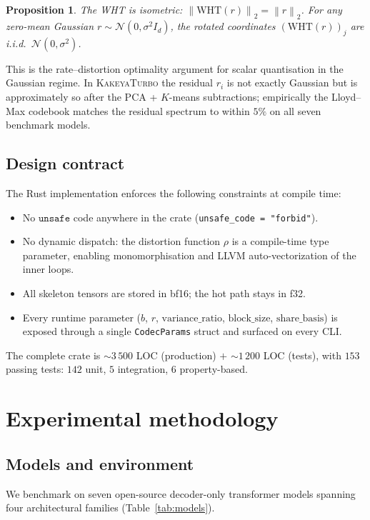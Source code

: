 \documentclass[11pt,a4paper]{article}
\theoremstyle{definition}
\theoremstyle{plain}
\newtheorem{proposition}[theorem]{Proposition}
\newcommand{\norm}[1]{\left\lVert#1\right\rVert}
\begin{document}
\begin{proposition}
The WHT is isometric: $\norm{\mathrm{WHT}(r)}_2 = \norm{r}_2$. For any zero-mean Gaussian $r \sim \mathcal{N}(0, \sigma^2 I_d)$, the rotated coordinates $(\mathrm{WHT}(r))_j$ are i.i.d.\ $\mathcal{N}(0, \sigma^2)$.
\end{proposition}

This is the rate--distortion optimality argument for scalar quantisation in the Gaussian regime. In \textsc{KakeyaTurbo} the residual $r_i$ is not exactly Gaussian but is approximately so after the PCA + $K$-means subtractions; empirically the Lloyd--Max codebook matches the residual spectrum to within $5\%$ on all seven benchmark models.

\subsection{Design contract}

The Rust implementation enforces the following constraints at compile time:
\begin{itemize}[leftmargin=*]
  \item No $\texttt{unsafe}$ code anywhere in the crate (\verb|unsafe_code = "forbid"|).
  \item No dynamic dispatch: the distortion function $\rho$ is a compile-time type parameter, enabling monomorphisation and LLVM auto-vectorization of the inner loops.
  \item All skeleton tensors are stored in bf16; the hot path stays in f32.
  \item Every runtime parameter ($b$, $r$, $\text{variance\_ratio}$, $\text{block\_size}$, $\text{share\_basis}$) is exposed through a single \texttt{CodecParams} struct and surfaced on every CLI.
\end{itemize}

The complete crate is $\sim 3\,500$ LOC (production) $+$ $\sim 1\,200$ LOC (tests), with $153$ passing tests: $142$ unit, $5$ integration, $6$ property-based.

\section{Experimental methodology}
\label{sec:methodology}

\subsection{Models and environment}
We benchmark on seven open-source decoder-only transformer models spanning four architectural families (Table~\ref{tab:models}).
\end{document}
